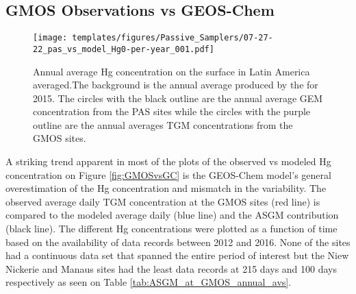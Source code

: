 \subsection{GMOS Observations vs GEOS-Chem}
\begin{figure}[H]
\centering
  \texttt{[image: templates/figures/Passive\_Samplers/07-27-22\_pas\_vs\_model\_Hg0-per-year\_001.pdf]}
  \caption{Annual average Hg concentration on the surface in Latin America averaged.The background is the annual average \hgc produced by the \on for 2015. The circles with the black outline are the annual average GEM concentration from the PAS sites while the circles with the purple outline are the annual averages TGM concentrations from the GMOS sites.}
  \label{fig:06-12-22_pas_vs_model_Hg0-per-year_001}
  
  
\end{figure}
\FloatBarrier
\begin{flushleft}
A striking trend apparent in most of the plots of the observed vs modeled Hg concentration on Figure \ref{fig:GMOSvsGC} is the GEOS-Chem model's general overestimation of the Hg concentration and mismatch in the variability. The observed average daily TGM concentration at the GMOS sites (red line) is compared to the modeled \on average daily \hg (blue line) and the ASGM contribution (black line). The different Hg concentrations were plotted as a function of time based on the availability of data records between 2012 and 2016. None of the sites had a continuous data set that spanned the entire period of interest but the Niew Nickerie and Manaus sites had the least data records at 215 days and 100 days respectively as seen on Table \ref{tab:ASGM_at_GMOS_annual_avs}.   
\end{flushleft}
\begin{table}[H]
\label{tab:ASGM_at_GMOS_annual_avs}

\centering
{}

\end{table}
